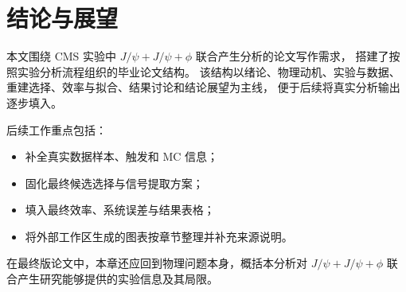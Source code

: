 \chapter{结论与展望}

本文围绕 CMS 实验中 \(J/\psi + J/\psi + \phi\) 联合产生分析的论文写作需求，
搭建了按照实验分析流程组织的毕业论文结构。
该结构以绪论、物理动机、实验与数据、重建选择、效率与拟合、结果讨论和结论展望为主线，
便于后续将真实分析输出逐步填入。

后续工作重点包括：

\begin{itemize}
  \item 补全真实数据样本、触发和 MC 信息；
  \item 固化最终候选选择与信号提取方案；
  \item 填入最终效率、系统误差与结果表格；
  \item 将外部工作区生成的图表按章节整理并补充来源说明。
\end{itemize}

在最终版论文中，本章还应回到物理问题本身，概括本分析对 \(J/\psi + J/\psi + \phi\)
联合产生研究能够提供的实验信息及其局限。
